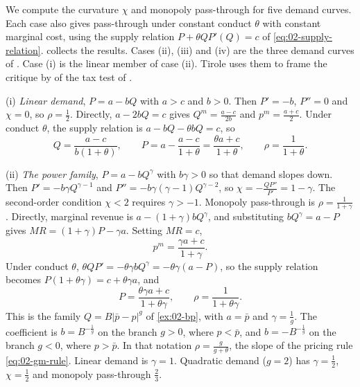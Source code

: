 \begin{example}\label{ex:02-pt-examples}
We compute the curvature $\chi$ and monopoly pass-through for five demand curves. Each case also gives
pass-through under constant conduct $\theta$ with constant marginal cost, using the supply relation
$P + \theta QP'(Q) = c$ of \eqref{eq:02-supply-relation}.  collects the results. Cases
(ii), (iii) and (iv) are the three demand curves of \citet[Exercise~1.3]{Tirole1988}. Case (i) is the linear
member of case (ii). Tirole uses them to frame the critique by \citet{BulowPfleiderer1983} of the tax test of
\citet{Sumner1981}.

(i) \emph{Linear demand}, $P = a - bQ$ with $a > c$ and $b > 0$. Then $P' = -b$, $P'' = 0$ and $\chi = 0$, so
$\rho = \frac{1}{2}$. Directly, $a - 2bQ = c$ gives $Q^m = \frac{a - c}{2b}$ and $p^m = \frac{a + c}{2}$. Under
conduct $\theta$, the supply relation is $a - bQ - \theta bQ = c$, so
\begin{equation*}
Q = \frac{a - c}{b(1 + \theta)}, \qquad P = a - \frac{a - c}{1 + \theta} = \frac{\theta a + c}{1 + \theta},
\qquad \rho = \frac{1}{1 + \theta} .
\end{equation*}

(ii) \emph{The power family}, $P = a - bQ^{\gamma}$ with $b\gamma > 0$ so that demand slopes down. Then
$P' = -b\gamma Q^{\gamma - 1}$ and $P'' = -b\gamma(\gamma - 1)Q^{\gamma - 2}$, so
$\chi = -\frac{QP''}{P'} = 1 - \gamma$. The second-order condition $\chi < 2$ requires $\gamma > -1$. Monopoly
pass-through is $\rho = \frac{1}{1 + \gamma}$. Directly, marginal revenue is $a - (1 + \gamma)bQ^{\gamma}$, and
substituting $bQ^{\gamma} = a - P$ gives $MR = (1 + \gamma)P - \gamma a$. Setting $MR = c$,
\begin{equation*}
p^m = \frac{\gamma a + c}{1 + \gamma} .
\end{equation*}
Under conduct $\theta$, $\theta QP' = -\theta\gamma bQ^{\gamma} = -\theta\gamma(a - P)$, so the supply relation
becomes $P(1 + \theta\gamma) = c + \theta\gamma a$, and
\begin{equation*}
P = \frac{\theta\gamma a + c}{1 + \theta\gamma}, \qquad \rho = \frac{1}{1 + \theta\gamma} .
\end{equation*}
This is the family $Q = B\lvert\bar p - p\rvert^{g}$ of \cref{ex:02-bp}, with $a = \bar p$ and $\gamma =
\frac{1}{g}$. The coefficient is $b = B^{-\frac{1}{g}}$ on the branch $g > 0$, where $p < \bar p$, and $b =
-B^{-\frac{1}{g}}$ on the branch $g < 0$, where $p > \bar p$. In that notation $\rho = \frac{g}{g + \theta}$, the slope of the pricing rule
\eqref{eq:02-gm-rule}. Linear demand is $\gamma = 1$. Quadratic demand ($g = 2$) has $\gamma = \frac{1}{2}$,
$\chi = \frac{1}{2}$ and monopoly pass-through $\frac{2}{3}$.


\end{example}
